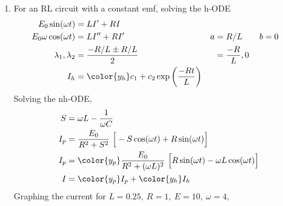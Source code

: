 \begin{enumerate}
    \item For an RL circuit with a constant emf, solving the h-ODE
          \begin{align}
              E_{0}\sin(\omega t)        & = LI' + RI                                                                              \\
              E_{0}\omega \cos(\omega t) & = LI'' + RI'                                                   & a & = R/L \qquad b = 0 \\
              \lambda_{1}, \lambda_{2}   & = \frac{-R/L \pm R/L}{2}                                       &   & = \frac{-R}{L}, 0  \\
              I_{h}                      & = {\color{y_h} c_{1} + c_{2}\exp\left( \frac{-Rt}{L} \right) }
          \end{align}
          Solving the nh-ODE,
          \begin{align}
              S     & = \omega L - \frac{1}{\omega C}                                             \\
              I_{p} & = \frac{E_{0}}{R^{2} + S^{2}}\ \Big[-S\cos(\omega t) + R\sin(\omega t)\Big] \\
              I_{p} & = {\color{y_p} \frac{E_{0}}{R^{2} + (\omega L)^{2}}\
              \Big[R\sin(\omega t) - \omega L \cos(\omega t)\Big]}                                \\
              I     & ={\color{y_p} I_{p}} + {\color{y_h}I_{h}}
          \end{align}
          Graphing the current for $ L = 0.25,\ R = 1,\ E = 10,\ \omega = 4$,
          \begin{figure}[H]
              \centering
          \end{figure}


\end{enumerate}
